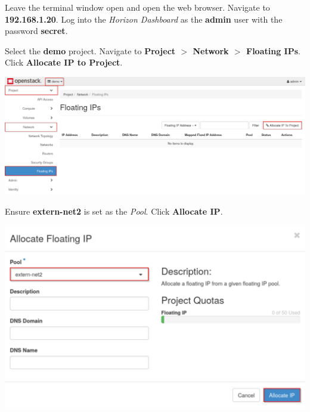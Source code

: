 \documentclass[letterpaper, 12pt]{article}
\begin{document}
\begin{enumerate}
    \begin{labstep}
        Leave the terminal window open and open the web browser.
        Navigate to \textbf{192.168.1.20}.
        Log into the \textit{Horizon Dashboard} as the \textbf{admin} user with the password \textbf{secret}.
    \end{labstep}

    \begin{labstep}
        Select the \textbf{demo} project.
        Navigate to \textbf{Project $>$ Network $>$ Floating IPs}.
        Click \textbf{Allocate IP to Project}.

        \begin{center}
            \includegraphics[width=\linewidth]{images/part3/step4.png}
        \end{center}
    \end{labstep}

    \begin{labstep}
        Ensure \textbf{extern-net2} is set as the \textit{Pool}.
        Click \textbf{Allocate IP}.

        \begin{center}
            \includegraphics[width=\linewidth]{images/part3/step5.png}
        \end{center}
    \end{labstep}


\end{enumerate}
\end{document}
